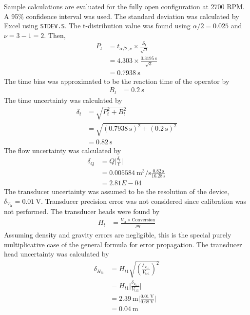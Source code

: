Sample calculations are evaluated for the fully open configuration at 2700 RPM. A 95\% confidence interval was used. The standard deviation was calculated by Excel using \texttt{STDEV.S}. The t-distribution value was found using $\alpha/2 = 0.025$ and $\nu = 3 - 1 = 2$. Then,
\begin{align*}
    P_t &= t_{\alpha/2, \nu} \times \frac{S_t}{\sqrt{n}} \\
    &= 4.303 \times \frac{\qty{0.3195}{\second}}{\sqrt{3}} \\
    &= \qty{0.7938}{\second}
\end{align*}
The time bias was approximated to be the reaction time of the operator by
\begin{align*}
    B_t &= \qty{0.2}{\second}
\end{align*}
The time uncertainty was calculated by
\begin{align*}
    \delta_t &= \sqrt{P_t^2 + B_t^2} \\
    &= \sqrt{(\qty{0.7938}{\second})^2 + (\qty{0.2}{\second})^2} \\
    &= \qty{0.82}{\second}
\end{align*}
The flow uncertainty was calculated by
\begin{align*}
    \delta_Q &= Q \bigg|\frac{\delta_t}{t}\bigg| \\
    &= \qty{0.005584}{\meter\cubed\per\second} \frac{\qty{0.82}{\second}}{\qty{16.28}{\second}} \\
    &= 2.81E-04
\end{align*}
The transducer uncertainty was assumed to be the resolution of the device, $\delta_{V_{\text{tr}}} = \qty{0.01}{\volt}$. Transducer precision error was not considered since calibration was not performed. The transducer heads were found by
\begin{align*}
    H_t &= \frac{V_{\text{tr}} \times \text{Conversion}}{\rho g}
\end{align*}
Assuming density and gravity errors are negligible, this is the special purely multiplicative case of the general formula for error propagation. The transducer head uncertainty was calculated by
\begin{align*}
    \delta_{H_{t1}} &= H_{t1} \sqrt{\left(\frac{\delta_{V_{\text{tr1}}}}{V_{\text{tr1}}}\right)^2} \\
    &= H_{t1} \bigg|\frac{\delta_{V_{\text{tr1}}}}{V_{\text{tr1}}}\bigg| \\
    &= \qty{2.39}{\meter} \bigg|\frac{\qty{0.01}{\volt}}{\qty{0.68}{\volt}}\bigg| \\
    &= \qty{0.04}{\meter}
\end{align*}
